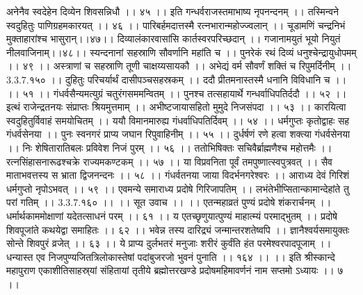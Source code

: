 अनेनैव स्वदेहेन दिव्येन शिवसन्निधौ ।। ४५ ।।
इति गन्धर्वराजस्तमाभाष्य नृपनन्दनम् ।।
तस्मिन्वने स्वदुहितुः पाणिग्रहमकारयत् ।। ४६ ।।
पारिबर्हमदात्तस्मै रत्नभारान्महोज्ज्वलान् ।।
चूडामणिं चन्द्रनिभं मुक्ताहारांश्च भासुरान्।।४७।।
दिव्यालंकारवासांसि कार्तस्वरपरिच्छदान् ।।
गजानामयुतं भूयो नियुतं नीलवाजिनाम्।।४८।।
स्यन्दनानां सहस्राणि सौवर्णानि महांति च ।।
पुनरेकं रथं दिव्यं धनुश्चेन्द्रायुधोपमम् ।। ४९ ।।
अस्त्राणां च सहस्राणि तूणी चाक्षय्यसायकौ ।।
अभेद्यं वर्म सौवर्णं शक्तिं च रिपुमर्दिनीम् ।। 3.3.7.१५० ।।
दुहितुः परिचर्यार्थं दासीपञ्चसहस्रकम् ।।
ददौ प्रीतमनास्तस्मै धनानि विविधानि च ।। ।। ५१ ।।
गंधर्वसैन्यमत्युग्रं चतुरंगसममन्वितम् ।।
पुनश्च तत्सहायार्थे गन्धर्वाधिपतिर्ददौ ।। ५२ ।।
इत्थं राजेन्द्रतनयः संप्राप्तः श्रियमुत्तमाम् ।।
अभीष्टजायासहितो मुमुदे निजसंपदा ।। ५३ ।।
कारयित्वा स्वदुहितुर्विवाहं समयोचितम् ।।
ययौ विमानमारुह्य गंधर्वाधिपतिर्दिवम् ।। ५४ ।।
धर्मगुप्तः कृतोद्वाहः सह गंधर्वसेनया ।।
पुनः स्वनगरं प्राप्य जघान रिपुवाहिनीम् ।। ५५ ।।
दुर्धर्षणं रणे हत्वा शक्त्या गंधर्वसेनया ।।
निः शेषितारातिबलः प्रविवेश निजं पुरम् ।। ५६ ।।
ततोभिषिक्तः सचिवैर्ब्राह्मणैश्च महोत्तमैः ।।
रत्नसिंहासनारूढश्चक्रे राज्यमकण्टकम् ।। ५७ ।।
या विप्रवनिता पूर्वं तमपुष्णात्स्वपुत्रवत् ।।
सैव माताभवत्तस्य स भ्राता द्विजनन्दनः ।। ५८ ।।
गंधर्वतनया जाया विदर्भनगरेश्वरः ।।
आराध्य देवं गिरिशं धर्मगुप्तो नृपोऽभवत् ।। ५९ ।।
एवमन्ये समाराध्य प्रदोषे गिरिजापतिम् ।।
लभंतेभीप्सितान्कामान्देहांते तु परां गतिम् ।। 3.3.7.१६० ।।
।। सूत उवाच ।। ।।
एतन्महाव्रतं पुण्यं प्रदोषे शंकरार्चनम् ।।
धर्मार्थकाममोक्षाणां यदेतत्साधनं परम् ।। ६१ ।।
य एतच्छृणुयात्पुण्यं माहात्म्यं परमाद्भुतम् ।।
प्रदोषे शिवपूजांते कथयेद्वा समाहितः ।। ६२ ।।
भवेन्न तस्य दारिद्र्यं जन्मान्तरशतेष्वपि ।।
ज्ञानैश्वर्यसमायुक्तः सोन्ते शिवपुरं व्रजेत् ।। ६३ ।।
ये प्राप्य दुर्लभतरं मनुजाः शरीरं कुर्वंति हंत परमेश्वरपादपूजाम् ।।
धन्यास्त एव निजपुण्यजितत्रिलोकास्तेषां पदांबुजरजो भुवनं पुनाति ।। १६४ ।। ।।
इति श्रीस्कान्दे महापुराण एकाशीतिसाहस्र्यां संहितायां तृतीये ब्रह्मोत्तरखण्डे प्रदोषमहिमावर्णनं नाम सप्तमो ऽध्यायः ।। ७ ।।
